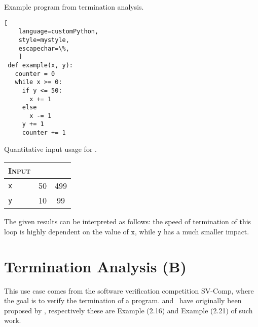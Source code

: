 \begin{marginlisting}[*-14]
  \caption{Example program from termination analysis.}
  \vspace{15pt}
\begin{lstlisting}[
    language=customPython,
    style=mystyle,
    escapechar=\%,
    ]
 def example(x, y):
   counter = 0
   while x >= 0:
     if y <= 50:
       x += 1
     else
       x -= 1
     y += 1
     counter += 1
\end{lstlisting}
\end{marginlisting}

\begin{margintable}
  \caption{Quantitative input usage for .}
  \centering
  \begin{tabular}{l | c c}
    \textsc{Input} & \textsc{\abstractoutcomesname{}} & \textsc{\abstractrangename{}} \\
    \toprule
    \texttt{x} & 50 & 499 \\
    \texttt{y} & 10 & 99 \\
    \bottomrule
  \end{tabular}
\end{margintable}

The given results can be interpreted as follows: the speed of termination of this loop is highly dependent on the value of $\texttt{x}$, while $\texttt{y}$ has a much smaller impact.



\section{Termination Analysis (B)}

This use case comes from the software verification competition SV-Comp, where the goal is to verify the termination of a program.  and~ have originally been proposed by , respectively these are Example (2.16) and Example (2.21) of such work.

